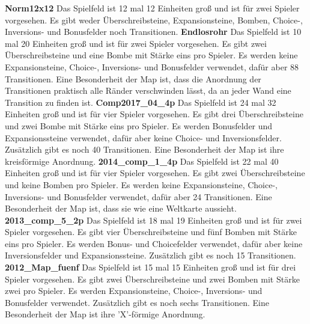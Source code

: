 \documentclass[12pt,a4paper,bibliography=totocnumbered,listof=totocnumbered]{scrartcl}
\begin{document}
	\textbf{Norm12x12}\newline
	Das Spielfeld ist 12 mal 12 Einheiten groß und ist für zwei Spieler vorgesehen. Es gibt weder Überschreibsteine, Expansionsteine, Bomben, Choice-, Inversions- und Bonusfelder noch Transitionen.\newline
	\textbf{Endlosrohr}\newline
	Das Spielfeld ist 10 mal 20 Einheiten groß und ist für zwei Spieler vorgesehen. Es gibt zwei Überschreibsteine und eine Bombe mit Stärke eins pro Spieler. Es werden keine Expansionsteine, Choice-, Inversions- und Bonusfelder verwendet, dafür aber 88 Transitionen. Eine Besonderheit der Map ist, dass die Anordnung der Transitionen praktisch alle Ränder verschwinden lässt, da an jeder Wand eine Transition zu finden ist. \newline
	\textbf{Comp2017\_04\_4p}\newline
	Das Spielfeld ist 24 mal 32 Einheiten groß und ist für vier Spieler vorgesehen. Es gibt drei Überschreibsteine und zwei Bombe mit Stärke eins pro Spieler. Es werden Bonusfelder und Expansionssteine verwendet, dafür aber keine Choice- und Inversionsfelder. Zusätzlich gibt es noch 40 Transitionen. Eine Besonderheit der Map ist ihre kreisförmige Anordnung.\newline
	\textbf{2014\_comp\_1\_4p}\newline
	Das Spielfeld ist 22 mal 40 Einheiten groß und ist für vier Spieler vorgesehen. Es gibt zwei Überschreibsteine und keine Bomben pro Spieler. Es werden keine Expansionsteine, Choice-, Inversions- und Bonusfelder verwendet, dafür aber 24 Transitionen. Eine Besonderheit der Map ist, dass sie wie eine Weltkarte aussieht.\newline
	\textbf{2013\_comp\_5\_2p}\newline
	Das Spielfeld ist 18 mal 19 Einheiten groß und ist für zwei Spieler vorgesehen. Es gibt vier Überschreibsteine und fünf Bomben mit Stärke eins pro Spieler. Es werden Bonus- und Choicefelder verwendet, dafür aber keine Inversionsfelder und Expansionssteine. Zusätzlich gibt es noch 15 Transitionen.\newline
	\textbf{2012\_Map\_fuenf}\newline
	Das Spielfeld ist 15 mal 15 Einheiten groß und ist für drei Spieler vorgesehen. Es gibt zwei Überschreibsteine und zwei Bomben mit Stärke zwei pro Spieler. Es werden Expansionsteine, Choice-, Inversions- und Bonusfelder verwendet. Zusätzlich gibt es noch sechs Transitionen. Eine Besonderheit der Map ist ihre 'X'-förmige Anordnung.\newline
\end{document}
